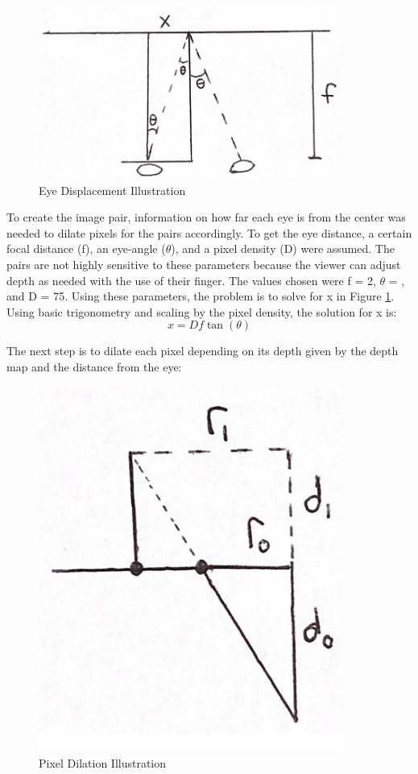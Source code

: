 \documentclass[12pt]{article}
\begin{document}
\begin{figure}
    \centering
    \includegraphics[width=100mm]{eye_disp_pic.png}
    \caption{Eye Displacement Illustration}
    \label{fig:eyedisp}
\end{figure}

To create the image pair, information on how far each eye is from the center was needed to dilate pixels for the pairs accordingly. To get the eye distance, a certain focal distance (f), an eye-angle (\(\theta\)), and a pixel density (D) were assumed. The pairs are not highly sensitive to these parameters because the viewer can adjust depth as needed with the use of their finger. The values chosen were f = 2, \(\theta\) = , and D = 75. Using these parameters, the problem is to solve for x in Figure \ref{fig:eyedisp}. Using basic trigonometry and scaling by the pixel density, the solution for x is: \[x = Df\tan(\theta)\]

The next step is to dilate each pixel depending on its depth given by the depth map and the distance from the eye:

\begin{figure}
    \centering
    \includegraphics[width=100mm]{dilation_pic.png}
    \caption{Pixel Dilation Illustration}
    \label{fig:pixeldi}
\end{figure}
\end{document}
